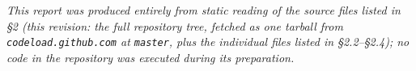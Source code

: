 \documentclass[11pt,a4paper]{article}
\newcommand{\code}[1]{\texttt{\small #1}}
\begin{document}
\vspace{0.4cm}
\noindent\textit{This report was produced entirely from static reading of
the source files listed in \S2 (this revision: the full repository tree,
fetched as one tarball from \code{codeload.github.com} at \code{master},
plus the individual files listed in \S2.2--\S2.4); no code in the
repository was executed during its preparation.}
\end{document}
